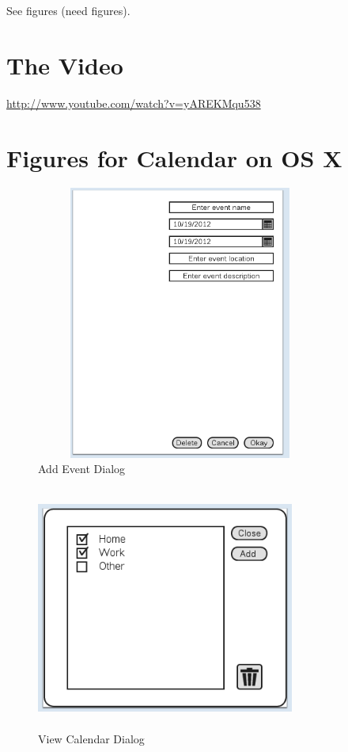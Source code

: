 \documentclass{article}
\begin{document}

See figures (need figures).
\section{The Video}

\url{http://www.youtube.com/watch?v=yAREKMqu538}


\appendix
\section{Figures for Calendar on OS X}

\begin{figure}
\centering
\includegraphics[height=9cm,width=9.5cm]{CMCLGDREvent.png}
\caption{Add Event Dialog}
\label{fig:addevent}
\end{figure}

\begin{figure}
\centering
\includegraphics[height=8cm,width=8.5cm]{CMCLGDRViewCalendar.png}
\caption{View Calendar Dialog}
\label{fig:viewcal}
\end{figure}
\end{document}
